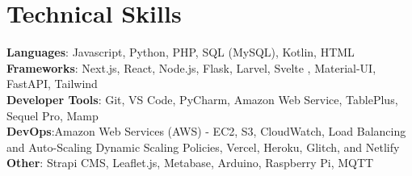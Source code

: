 \documentclass[letterpaper,11pt]{article}
\begin{document}
%
\section{Technical Skills}
 \begin{itemize}[leftmargin=0.15in, label={}]
    \small{\item{
     \textbf{Languages}{: Javascript, Python, PHP, SQL (MySQL), Kotlin, HTML} \\
     \textbf{Frameworks}{: Next.js, React, Node.js, Flask, Larvel, Svelte , Material-UI, FastAPI, Tailwind} \\
     \textbf{Developer Tools}{: Git, VS Code,  PyCharm, Amazon Web Service, TablePlus, Sequel Pro, Mamp} \\
      \textbf{DevOps}{:Amazon Web Services (AWS) - EC2, S3, CloudWatch, Load Balancing and Auto-Scaling Dynamic Scaling Policies, Vercel, Heroku, Glitch, and Netlify } \\
     \textbf{Other}{: Strapi CMS, Leaflet.js, Metabase, Arduino, Raspberry Pi, MQTT}
    }}
 \end{itemize}


\end{document}
